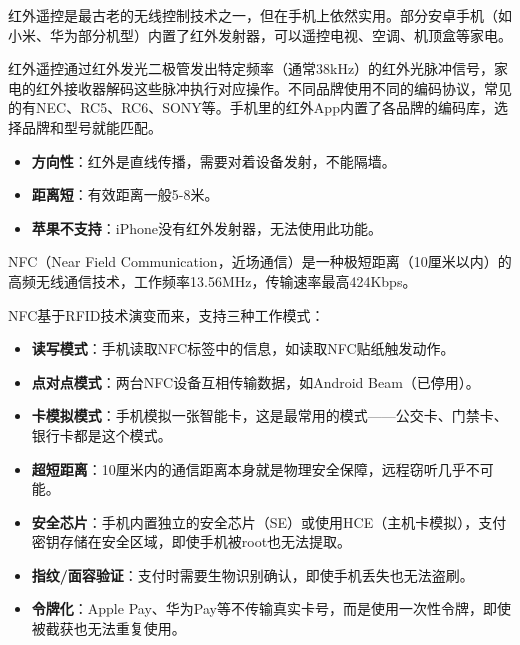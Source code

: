 
红外遥控是最古老的无线控制技术之一，但在手机上依然实用。部分安卓手机（如小米、华为部分机型）内置了红外发射器，可以遥控电视、空调、机顶盒等家电。


红外遥控通过红外发光二极管发出特定频率（通常38kHz）的红外光脉冲信号，家电的红外接收器解码这些脉冲执行对应操作。不同品牌使用不同的编码协议，常见的有NEC、RC5、RC6、SONY等。手机里的红外App内置了各品牌的编码库，选择品牌和型号就能匹配。


\begin{itemize}
  \item \textbf{方向性}：红外是直线传播，需要对着设备发射，不能隔墙。
  \item \textbf{距离短}：有效距离一般5-8米。
  \item \textbf{苹果不支持}：iPhone没有红外发射器，无法使用此功能。
\end{itemize}


NFC（Near Field Communication，近场通信）是一种极短距离（10厘米以内）的高频无线通信技术，工作频率13.56MHz，传输速率最高424Kbps。


NFC基于RFID技术演变而来，支持三种工作模式：

\begin{itemize}
  \item \textbf{读写模式}：手机读取NFC标签中的信息，如读取NFC贴纸触发动作。
  \item \textbf{点对点模式}：两台NFC设备互相传输数据，如Android Beam（已停用）。
  \item \textbf{卡模拟模式}：手机模拟一张智能卡，这是最常用的模式——公交卡、门禁卡、银行卡都是这个模式。
\end{itemize}


\begin{itemize}
  \item \textbf{超短距离}：10厘米内的通信距离本身就是物理安全保障，远程窃听几乎不可能。
  \item \textbf{安全芯片}：手机内置独立的安全芯片（SE）或使用HCE（主机卡模拟），支付密钥存储在安全区域，即使手机被root也无法提取。
  \item \textbf{指纹/面容验证}：支付时需要生物识别确认，即使手机丢失也无法盗刷。
  \item \textbf{令牌化}：Apple Pay、华为Pay等不传输真实卡号，而是使用一次性令牌，即使被截获也无法重复使用。
\end{itemize}

